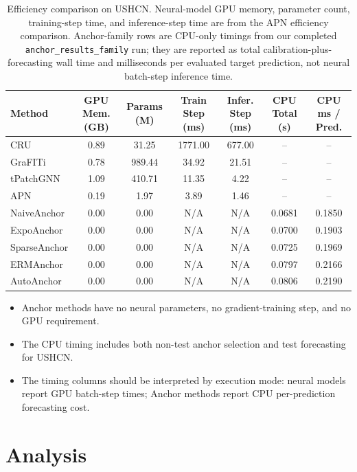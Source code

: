 \documentclass{article}
\newcommand{\method}{AutoAnchor}
\begin{document}
\begin{table}[t]
\caption{Efficiency comparison on USHCN. Neural-model GPU memory, parameter
count, training-step time, and inference-step time are from the APN efficiency
comparison. Anchor-family rows are CPU-only timings from our completed
\texttt{anchor\_results\_family} run; they are reported as total
calibration-plus-forecasting wall time and milliseconds per evaluated target
prediction, not neural batch-step inference time.}
\label{tab:efficiency}
\centering
\scriptsize
\begin{tabular}{lcccccc}
\toprule
Method
& GPU Mem. (GB)
& Params (M)
& Train Step (ms)
& Infer. Step (ms)
& CPU Total (s)
& CPU ms / Pred. \\
\midrule
CRU & 0.89 & 31.25 & 1771.00 & 677.00 & -- & -- \\
GraFITi & 0.78 & 989.44 & 34.92 & 21.51 & -- & -- \\
tPatchGNN & 1.09 & 410.71 & 11.35 & 4.22 & -- & -- \\
APN & 0.19 & 1.97 & 3.89 & 1.46 & -- & -- \\
\midrule
NaiveAnchor & 0.00 & 0.00 & N/A & N/A & 0.0681 & 0.1850 \\
ExpoAnchor & 0.00 & 0.00 & N/A & N/A & 0.0700 & 0.1903 \\
SparseAnchor & 0.00 & 0.00 & N/A & N/A & 0.0725 & 0.1969 \\
ERMAnchor & 0.00 & 0.00 & N/A & N/A & 0.0797 & 0.2166 \\
\method{} & 0.00 & 0.00 & N/A & N/A & 0.0806 & 0.2190 \\
\bottomrule
\end{tabular}
\end{table}

\begin{itemize}
    \item Anchor methods have no neural parameters, no gradient-training step,
    and no GPU requirement.
    \item The CPU timing includes both non-test anchor selection and test
    forecasting for USHCN.
    \item The timing columns should be interpreted by execution mode: neural
    models report GPU batch-step times; Anchor methods report CPU
    per-prediction forecasting cost.
\end{itemize}

\section{Analysis}
\end{document}
